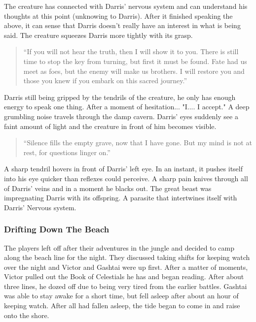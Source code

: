The creature has connected with Darris' nervous system and can understand his thoughts at this point (unknowing to Darris). After it finished speaking the above, it can sense that Darris doesn't really have an interest in what is being said. The creature squeezes Darris more tightly with its grasp.

\begin{quote}
	``If you will not hear the truth, then I will show it to you. There is still time to stop the key from turning, but first it must be found. Fate had us meet as foes, but the enemy will make us brothers. I will restore you and those you knew if you embark on this sacred journey.''
\end{quote}

Darris still being gripped by the tendrils of the creature, he only has enough energy to speak one thing. After a moment of hesitation... "I.... I accept." A deep grumbling noise travels through the damp cavern. Darris' eyes suddenly see a faint amount of light and the creature in front of him becomes visible. 

\begin{quote}
	``Silence fills the empty grave, now that I have gone. But my mind is not at rest, for questions linger on.''
\end{quote}

A sharp tendril hovers in front of Darris' left eye. In an instant, it pushes itself into his eye quicker than reflexes could perceive. A sharp pain knives through all of Darris' veins and in a moment he blacks out. The great beast was impregnating Darris with its offspring. A parasite that intertwines itself with Darris' Nervous system.

\subsubsection{Drifting Down The Beach}

The players left off after their adventures in the jungle and decided to camp along the beach line for the night. They discussed taking shifts for keeping watch over the night and Victor and Gashtai were up first. After a matter of moments, Victor pulled out the Book of Celestials he has and began reading. After about three lines, he dozed off due to being very tired from the earlier battles. Gashtai was able to stay awake for a short time, but fell asleep after about an hour of keeping watch. After all had fallen asleep, the tide began to come in and raise onto the shore.

